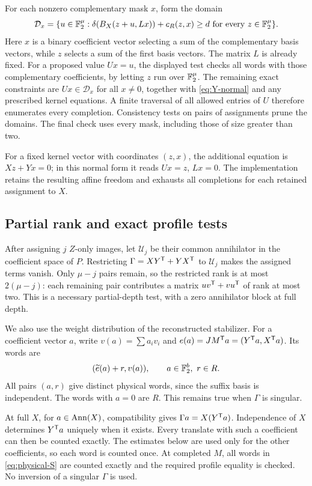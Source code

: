 For each nonzero complementary mask \(x\), form the domain
\[
 \mathcal D_x=\{u\in\mathbb F_2^\mu:\delta(B_X(z+u,Lx))+
                       c_R(z,x)\geq d\text{ for every }z\in\mathbb F_2^\mu\}.
\]
Here \(x\) is a binary coefficient vector selecting a sum of the
complementary basis vectors, while \(z\) selects a sum of the first
basis vectors. The matrix \(L\) is already fixed. For a proposed value
\(Ux=u\), the displayed test checks all words with those complementary
coefficients, by letting \(z\) run over \(\mathbb F_2^\mu\).
The remaining exact constraints are \(Ux\in\mathcal D_x\) for all
\(x\ne0\), together with \eqref{eq:Y-normal} and any prescribed
kernel equations. A finite traversal of all allowed entries of \(U\)
therefore enumerates every completion. Consistency tests on pairs of assignments prune the domains. The final
check uses every mask, including those of size greater than two.

For a fixed kernel vector with coordinates \((z,x)\), the additional
equation is \(Xz+Yx=0\); in this normal form it reads
\(Ux=z\), \(Lx=0\). The implementation retains the resulting affine
freedom and exhausts all completions for each retained assignment to
\(X\).

\subsection{Partial rank and exact profile tests}

After assigning \(j\) \(Z\)-only images, let \(\mathcal U_j\) be their common
annihilator in the coefficient space of \(P\). Restricting
\(\Gamma=XY^\mathsf T+YX^\mathsf T\) to \(\mathcal U_j\) makes the assigned terms vanish.
Only \(\mu-j\) pairs remain, so the restricted rank is at most
\(2(\mu-j)\): each remaining pair contributes a matrix
\(uv^\mathsf T+vu^\mathsf T\) of rank at most two. This is a necessary partial-depth test, with a zero
annihilator block at full depth.

We also use the weight distribution of the reconstructed stabilizer.
For a coefficient vector \(a\), write
\(v(a)=\sum a_iv_i\) and
\(e(a)=JM^\mathsf T a=(Y^\mathsf T a,X^\mathsf T a)\). Its words are
\begin{equation}\label{eq:physical-S}
 (\widetilde e(a)+r,v(a)),\qquad a\in\mathbb F_2^b,\ r\in R.
\end{equation}
All pairs \((a,r)\) give distinct physical words, since the suffix basis
is independent. The words with \(a=0\) are \(R\).
This remains true when \(\Gamma\) is singular.

At full \(X\), for \(a\in\operatorname{Ann}(X)\), compatibility gives
\(\Gamma a=X(Y^\mathsf T a)\). Independence of \(X\) determines
\(Y^\mathsf T a\) uniquely when it exists. Every translate with such a coefficient can then be counted exactly.
The estimates below are used only for the other coefficients, so each
word is counted once. At completed \(M\),
all words in \eqref{eq:physical-S} are counted exactly and the required
profile equality is checked. No inversion of a singular \(\Gamma\)
is used.

